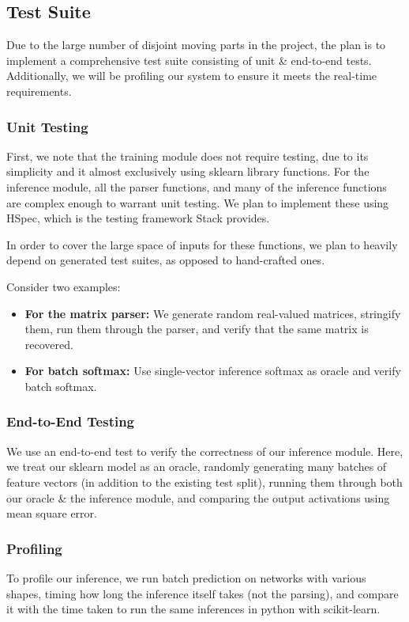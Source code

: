 \documentclass[12pt, titlepage]{article}
\begin{document}
\subsection{Test Suite}
Due to the large number of disjoint moving parts in the project, the plan is to implement a comprehensive test suite consisting of unit \& end-to-end tests. Additionally, we will be profiling our system to ensure it meets the real-time requirements.

\subsubsection{Unit Testing}
First, we note that the training module does not require testing, due to its simplicity and it almost exclusively using sklearn library functions. For the inference module, all the parser functions, and many of the inference functions are complex enough to warrant unit testing. We plan to implement these using HSpec, which is the testing framework Stack provides.\bigskip

In order to cover the large space of inputs for these functions, we plan to heavily depend on generated test suites, as opposed to hand-crafted ones.

Consider two examples:
\begin{itemize}
	\item \textbf{For the matrix parser:} We generate random real-valued matrices, stringify them, run them through the parser, and verify that the same matrix is recovered.
	\item \textbf{For batch softmax:} Use single-vector inference softmax as oracle and verify batch softmax.
\end{itemize}

\subsubsection{End-to-End Testing}
We use an end-to-end test to verify the correctness of our inference module. Here, we treat our sklearn model as an oracle, randomly generating many batches of feature vectors (in addition to the existing test split), running them through both our oracle \& the inference module, and comparing the output activations using mean square error.

\subsubsection{Profiling}
To profile our inference, we run batch prediction on networks with various shapes, timing how long the inference itself takes (not the parsing), and compare it with the time taken to run the same inferences in python with scikit-learn.
\end{document}
